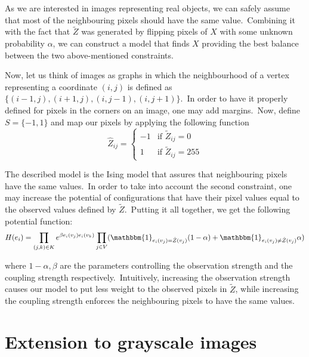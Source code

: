 \documentclass[shortabstract, english, lic]{iithesis}
\theoremstyle{default_theorem_style}\newtheorem{theorem}{Theorem}
\theoremstyle{default_theorem_style}\newtheorem{definition}{Definition}
\begin{document}
\noindent As we are interested in images representing real objects, we can safely assume that most of the neighbouring
pixels should have the same value.\ Combining it with the fact that $\tilde{Z}$ was generated by flipping pixels of
$X$ with some unknown probability $\alpha$, we can construct a model that finds $X$ providing the best balance between the
two above-mentioned constraints.\newline

\noindent Now, let us think of images as graphs in which the neighbourhood of a vertex representing a
coordinate $(i, j)$ is defined as $\{(i - 1, j), (i + 1, j), (i, j - 1), (i, j + 1)\}$.\ In
order to have it properly defined for pixels in the corners on an image, one may add margins.\ Now, define
$S = \{-1, 1\}$ and map our pixels by applying the following function
$$
\hat{Z}_{ij} =
\begin{cases}
  -1 &\text{if $\tilde{Z}_{ij} = 0$}\\
  1 &\text{if $\tilde{Z}_{ij} = 255$}
\end{cases}
$$

\noindent The described model is the Ising model that assures that neighbouring pixels have the same values.\ In order
to take into account the second constraint, one may increase the potential of configurations that have their pixel
values equal to the observed values defined by $\tilde{Z}$.\ Putting it all together, we get the following potential
function:
$$
H(e_i) = \prod\limits_{(j, k) \in K} e^{\beta e_i(v_j)e_i(v_k)}
\prod\limits_{j \in V}(\mathbbm{1}_{e_i(v_j) = \hat{Z}(v_j)}(1 - \alpha) +
\mathbbm{1}_{e_i(v_j) \neq \hat{Z}(v_j)}\alpha)
$$

\noindent where $1 - \alpha, \beta$ are the parameters controlling the observation strength and the coupling strength
respectively.\ Intuitively, increasing the observation strength causes our model to put less weight to the
observed pixels in $\tilde{Z}$, while increasing the coupling strength enforces the neighbouring pixels to have the
same values.

\section{Extension to grayscale images}
\end{document}

